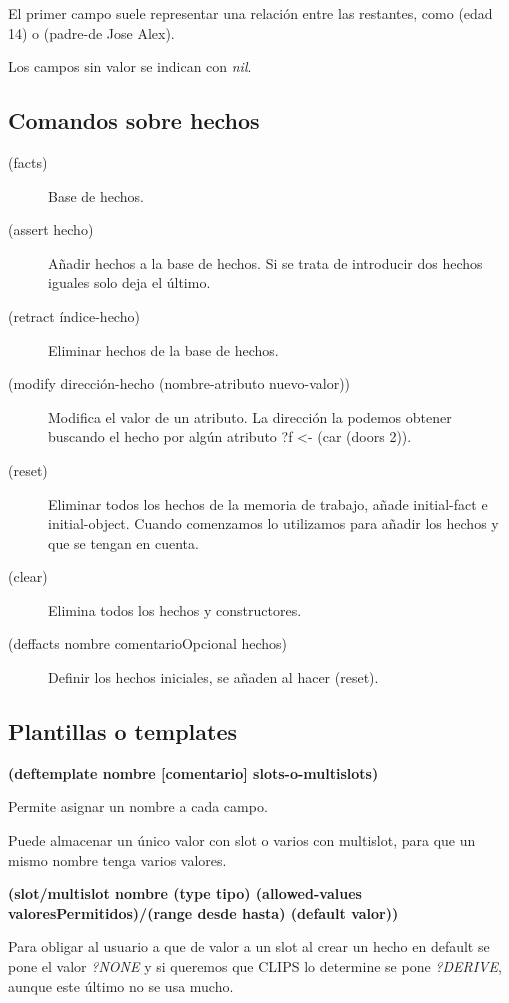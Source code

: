 \documentclass[12pt, twoside, openright]{report} %
\begin{document}
El primer campo suele representar una relación entre las restantes, como (edad 14) o (padre-de Jose Alex).

Los campos sin valor se indican con \textit{nil}.

\pagebreak
\subsection{Comandos sobre hechos}
\begin{description}
	\item[(facts)] Base de hechos.
	\item[(assert hecho)] Añadir hechos a la base de hechos. Si se trata de introducir dos hechos iguales solo deja el último.
	\item[(retract índice-hecho)] Eliminar hechos de la base de hechos.
	\item[(modify dirección-hecho (nombre-atributo nuevo-valor))] Modifica el valor de un atributo. La dirección la podemos obtener buscando el hecho por algún atributo ?f <- (car (doors 2)).
	\item[(reset)] Eliminar todos los hechos de la memoria de trabajo, añade initial-fact e initial-object. Cuando comenzamos lo utilizamos para añadir los hechos y que se tengan en cuenta.
	\item[(clear)] Elimina todos los hechos y constructores.
	\item[(deffacts nombre comentarioOpcional hechos)] Definir los hechos iniciales, se añaden al hacer (reset).
\end{description}

\subsection{Plantillas o templates}
\textbf{(deftemplate nombre [comentario] slots-o-multislots)}

Permite asignar un nombre a cada campo.

Puede almacenar un único valor con slot o varios con multislot, para que un mismo nombre tenga varios valores.

\textbf{(slot/multislot nombre (type tipo) (allowed-values valoresPermitidos)/(range desde hasta) (default valor))}

Para obligar al usuario a que de valor a un slot al crear un hecho en default se pone el valor \textit{?NONE} y si queremos que CLIPS lo determine se pone \textit{?DERIVE}, aunque este último no se usa mucho.

\pagebreak
\end{document}
